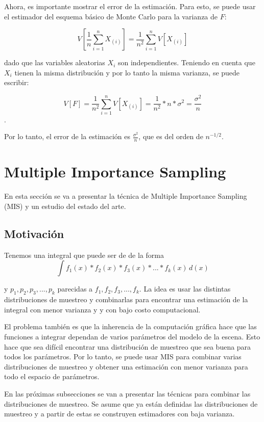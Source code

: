 \documentclass{article}
\begin{document}
Ahora, es importante mostrar el error de la estimación. Para esto, se puede usar el estimador del esquema básico de Monte Carlo para la varianza de $F$:

$$V[\frac{1}{n}\sum_{i=1}^{n} X_{(i)}] = \frac{1}{n^{2}} \sum_{i=1}^{n} V[X_{(i)}]$$

dado que las variables aleatorias $X_{i}$ son independientes. Teniendo en cuenta que $X_{i}$ tienen la misma distribución y por lo tanto la misma varianza, se puede escribir:

$$V[F] = \frac{1}{n^{2}} \sum_{i=1}^{n} V[X_{(i)}] = \frac{1}{n^{2}} * n * \sigma^{2} = \frac{\sigma^{2}}{n}$$.

Por lo tanto, el error de la estimación es $\frac{\sigma^{2}}{n}$, que es del orden de $n^{-1/2}$.

\section{Multiple Importance Sampling}

En esta sección se va a presentar la técnica de Multiple Importance Sampling (MIS) y un estudio del estado del arte.

\subsection{Motivación}

Tenemos una integral que puede ser de de la forma
$$ \int f_{1}(x) * f_{2}(x) * f_{3}(x) * ... * f_{k}(x) \,d(x)$$

y $ p_{1}, p_{2}, p_{3}, ..., p_{k}$ parecidas a $f_{1}, f_{2}, f_{3}, ..., f_{k}$.
La idea es usar las distintas distribuciones de muestreo y combinarlas para encontrar una estimación de la integral con menor varianza y y con bajo costo computacional.

El problema también es que la inherencia de la computación gráfica hace que las funciones a integrar dependan de varios parámetros del modelo de la escena.
Esto hace que sea difícil encontrar una distribución de muestreo que sea buena para todos los parámetros.
Por lo tanto, se puede usar MIS para combinar varias distribuciones de muestreo y obtener una estimación con menor varianza para todo el espacio de parámetros.

En las próximas subsecciones se van a presentar las técnicas para combinar las distribuciones de muestreo.
Se asume que ya están definidas las distribuciones de muestreo y a partir de estas se construyen estimadores con baja varianza.
\end{document}
